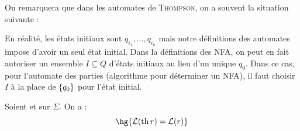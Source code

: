     On remarquera que dans les automates de \textsc{Thompson}, on a souvent la situation suivante :
    \begin{tikzpicture}
        
    \end{tikzpicture}
    En réalité, les  états initiaux sont $q_{i_1}, \dots, q_{i_n}$ mais notre définitions des automates impose d'avoir un seul état initial. Dans la définitions des NFA, on peut en fait autoriser un ensemble $I \subseteq Q$ d'états initiaux au lieu d'un unique $q_0$. Dans ce cas, pour l'automate des parties (algorithme pour déterminer un NFA), il faut choisir $I$ à la place de $\ens{q_0}$ pour l'état initial.
    
    \begin{theorem}{}{}
        Soient  et  sur $\Sigma$. On a :
        \[ \hg{\bcL\p{\th r} = \bcL\p{r}}\]
    \end{theorem}
    
